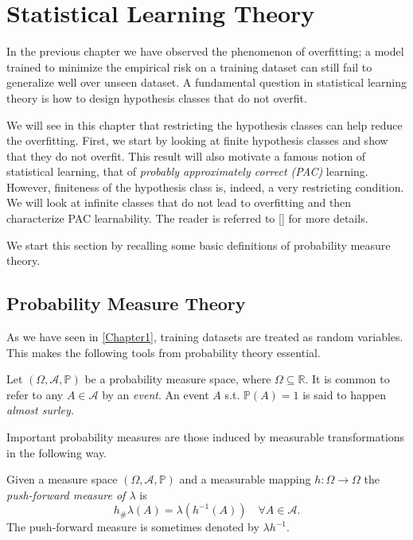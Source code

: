 \chapter{Statistical Learning Theory} %

\label{Chapter2} %
\setcounter{chapter}{2}
In the previous chapter we have observed the phenomenon of overfitting; a model
trained to minimize the empirical risk on a training dataset can still fail to generalize
well over unseen dataset. A fundamental question in statistical learning theory is how to design
hypothesis classes that do not overfit.  

We will see in this chapter that restricting the hypothesis classes can help
reduce the overfitting. First, we start by looking at finite hypothesis classes
and show that they do not overfit. This result will also motivate a famous
notion of statistical learning, that of \emph{probably approximately correct
(PAC)} learning. However, finiteness of the hypothesis class is, indeed, a very
restricting condition. We will look at infinite classes that do not lead to
overfitting and then characterize PAC learnability. The reader is referred to
[] for more details. 

We start this section by recalling some basic definitions of probability
measure theory.
\section{Probability Measure Theory}
As we have seen in \autoref{Chapter1}, training datasets are treated as random
variables. This makes the following tools from probability theory essential. 

Let $(\Omega,\mathcal{A}, \mathbb{P})$ be a probability measure space, where $\Omega \subseteq \mathbb{R}$. 
It is common to refer to any $A \in \mathcal{A}$ by an \emph{event}. An event
$A$ s.t. $\mathbb{P}(A)=1$ is said to happen \emph{almost surley.}

Important probability measures are those induced by measurable transformations in the following way. 
\begin{definition}
	Given a measure space $(\Omega, \mathcal{A}, \mathbb{P})$ and a measurable mapping $h:\Omega \to \Omega$ 
	the \emph{push-forward measure of $\lambda$} is 
	$$
	h_\#\lambda (A) = \lambda (h^{-1}(A)) \quad  \forall A \in \mathcal{A}.
	$$
	The push-forward measure is sometimes denoted by $\lambda h^{-1}$.
\end{definition}

